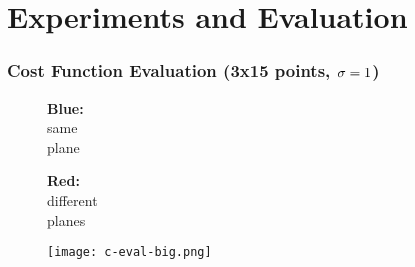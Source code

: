 \section{Experiments and Evaluation}
\frame{\tableofcontents[currentsection]}


\begin{frame}
    \frametitle{Cost Function Evaluation (3x15 points, $\sigma=1$)}
    \begin{figure}[h]
        \centering
        \vspace{-10px}
        \begin{minipage}{0.17\textwidth}
            \textbf{Blue:}\\ 
            same\\
            plane
            
            \vspace{15px}
            \textbf{Red:}\\
            different\\
            planes
        \end{minipage}
        \begin{minipage}{0.8\textwidth}
            \texttt{[image: c-eval-big.png]}
        \end{minipage}
        \vspace{-15px}
    \end{figure}
\end{frame}


